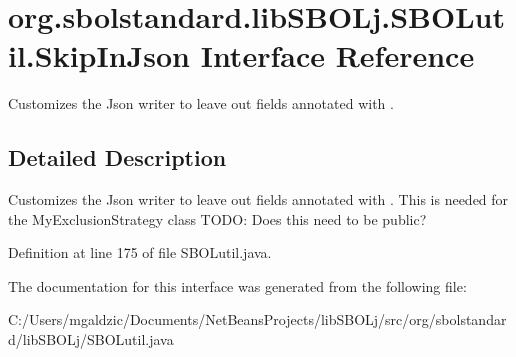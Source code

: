 \hypertarget{interfaceorg_1_1sbolstandard_1_1lib_s_b_o_lj_1_1_s_b_o_lutil_1_1_skip_in_json}{
\section{org.sbolstandard.libSBOLj.SBOLutil.SkipInJson Interface Reference}
\label{interfaceorg_1_1sbolstandard_1_1lib_s_b_o_lj_1_1_s_b_o_lutil_1_1_skip_in_json}
}


Customizes the Json writer to leave out fields annotated with .  




\subsection{Detailed Description}
Customizes the Json writer to leave out fields annotated with . This is needed for the MyExclusionStrategy class TODO: Does this need to be public? 

Definition at line 175 of file SBOLutil.java.



The documentation for this interface was generated from the following file:\begin{DoxyCompactItemize}
\item 
C:/Users/mgaldzic/Documents/NetBeansProjects/libSBOLj/src/org/sbolstandard/libSBOLj/SBOLutil.java\end{DoxyCompactItemize}
